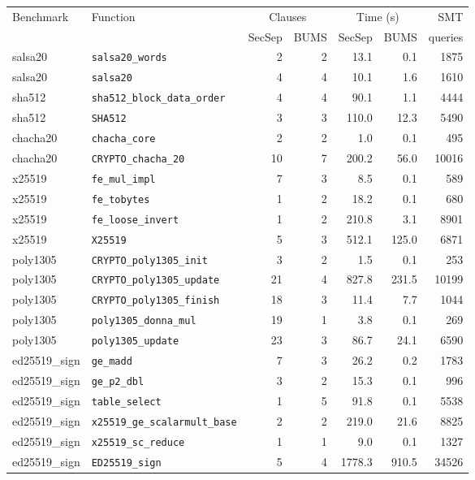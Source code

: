 \begin{tabular}{llrrrrr}
\toprule
Benchmark & Function & \multicolumn{2}{c}{Clauses} & \multicolumn{2}{c}{Time (s)} & SMT\\
 & & SecSep & BUMS & SecSep & BUMS & queries\\
\midrule
salsa20 & \texttt{salsa20\_words} & 2 & 2 & 13.1 & 0.1 & 1875\\
salsa20 & \texttt{salsa20} & 4 & 4 & 10.1 & 1.6 & 1610\\
sha512 & \texttt{sha512\_block\_data\_order} & 4 & 4 & 90.1 & 1.1 & 4444\\
sha512 & \texttt{SHA512} & 3 & 3 & 110.0 & 12.3 & 5490\\
chacha20 & \texttt{chacha\_core} & 2 & 2 & 1.0 & 0.1 & 495\\
chacha20 & \texttt{CRYPTO\_chacha\_20} & 10 & 7 & 200.2 & 56.0 & 10016\\
x25519 & \texttt{fe\_mul\_impl} & 7 & 3 & 8.5 & 0.1 & 589\\
x25519 & \texttt{fe\_tobytes} & 1 & 2 & 18.2 & 0.1 & 680\\
x25519 & \texttt{fe\_loose\_invert} & 1 & 2 & 210.8 & 3.1 & 8901\\
x25519 & \texttt{X25519} & 5 & 3 & 512.1 & 125.0 & 6871\\
poly1305 & \texttt{CRYPTO\_poly1305\_init} & 3 & 2 & 1.5 & 0.1 & 253\\
poly1305 & \texttt{CRYPTO\_poly1305\_update} & 21 & 4 & 827.8 & 231.5 & 10199\\
poly1305 & \texttt{CRYPTO\_poly1305\_finish} & 18 & 3 & 11.4 & 7.7 & 1044\\
poly1305 & \texttt{poly1305\_donna\_mul} & 19 & 1 & 3.8 & 0.1 & 269\\
poly1305 & \texttt{poly1305\_update} & 23 & 3 & 86.7 & 24.1 & 6590\\
ed25519\_sign & \texttt{ge\_madd} & 7 & 3 & 26.2 & 0.2 & 1783\\
ed25519\_sign & \texttt{ge\_p2\_dbl} & 3 & 2 & 15.3 & 0.1 & 996\\
ed25519\_sign & \texttt{table\_select} & 1 & 5 & 91.8 & 0.1 & 5538\\
ed25519\_sign & \texttt{x25519\_ge\_scalarmult\_base} & 2 & 2 & 219.0 & 21.6 & 8825\\
ed25519\_sign & \texttt{x25519\_sc\_reduce} & 1 & 1 & 9.0 & 0.1 & 1327\\
ed25519\_sign & \texttt{ED25519\_sign} & 5 & 4 & 1778.3 & 910.5 & 34526\\
\bottomrule
\end{tabular}
